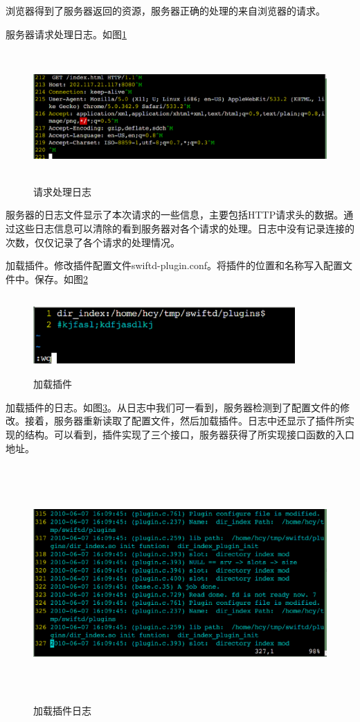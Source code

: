 \documentclass[twoside, xetex]{report}
\begin{document}
	浏览器得到了服务器返回的资源，服务器正确的处理的来自浏览器的请求。
	
	服务器请求处理日志。如图\ref{access1log}
	
	\begin{figure}[htbp]
	\centering
	\includegraphics[height=5cm, width=15cm]{pics/access1log.eps}
	\caption{请求处理日志}
	\label{access1log}
	\end{figure}
	
	服务器的日志文件显示了本次请求的一些信息，主要包括HTTP请求头的数据。通过这些日志信息可以清除的看到服务器对各个请求的处理。日志中没有记录连接的次数，仅仅记录了各个请求的处理情况。
	
	
	加载插件。修改插件配置文件swiftd-plugin.conf。将插件的位置和名称写入配置文件中。保存。如图\ref{pluginconf}
	\begin{figure}[htbp]
	\centering
	\includegraphics[height=3cm, width=10cm]{pics/pluginconf.eps}
	\caption{加载插件}
	\label{pluginconf}
	\end{figure}
	
	加载插件的日志。如图\ref{loadpluginlog}。从日志中我们可一看到，服务器检测到了配置文件的修改。接着，服务器重新读取了配置文件，然后加载插件。日志中还显示了插件所实现的结构。可以看到，插件实现了三个接口，服务器获得了所实现接口函数的入口地址。
	
	\begin{figure}[htbp]
	\centering
	\includegraphics[height=9cm, width=15cm]{pics/loadpluginlog.eps}
	\caption{加载插件日志}
	\label{loadpluginlog}
	\end{figure}
	
\end{document}
